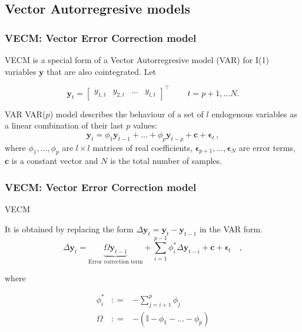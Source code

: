 \documentclass[compress,red]{beamer}
\begin{document}
\subsection{Vector Autorregresive models}
\begin{frame}
\frametitle{VECM: Vector Error Correction model}

VECM is a special form of a Vector Autorregresive model (VAR) for I(1)
variables $\mathbf{y}$ that are also cointegrated. Let 

\begin{equation*}
\label{eq:variables}
\mathbf{y}_t = 
\begin{bmatrix} y_{1,t} & y_{2,t} & \dots & y_{l,t}
\end{bmatrix}^\top \, \qquad t=p+1, \dots N. 
\end{equation*}

\begin{block}{VAR}
VAR($p$) model describes the behaviour of a set of $l$
endogenous variables as a linear combination of their last $p$ values:
{\color{blue}
\begin{equation*}
\label{eq:var}
 \mathbf{y}_t = \phi_1 \mathbf{y}_{t-1}  + \dots +   \phi_p\mathbf{y}_{t-p}
+ \mathbf{c} + \mathbf{\epsilon}_t \, ,
\end{equation*}}
\noindent where  ${\phi_1,\dots,\phi_p}$ are $l \times l$
matrices of real coefficients,
$\mathbf{\epsilon}_{p+1},\dots,\mathbf{\epsilon}_N$ are error terms,
$\mathbf{c}$ is a constant vector and $N$ is the total number of samples.
\end{block}
\end{frame}



\begin{frame}
\frametitle{VECM: Vector Error Correction model}
\begin{block}{VECM}

It is obtained by replacing the form {\color{red} $\Delta
\mathbf{y}_t = \mathbf{y}_t - \mathbf{y}_{t-1}$} in the VAR form.
{\color{blue}
\begin{equation}
 \label{eq:vec}
 \Delta \mathbf{y}_t = 
 \underbrace{ \Omega\mathbf{y}_{t-1}}_\text{Error correction term} + 
 \sum_{i=1}^{p-1}
\phi_i^* \Delta \mathbf{y}_{t-i}  + \mathbf{c} + \mathbf{\epsilon}_t \quad ,
\end{equation}}
\end{block}

\noindent where 

\begin{eqnarray*}
\phi_i^* &: =& -\sum_{j=i+1}^{p} \phi_j \\
\Omega &: =& -(\mathbb{I}-\phi_1-\dots-\phi_p) 
\end{eqnarray*}
\end{frame}
\end{document}
